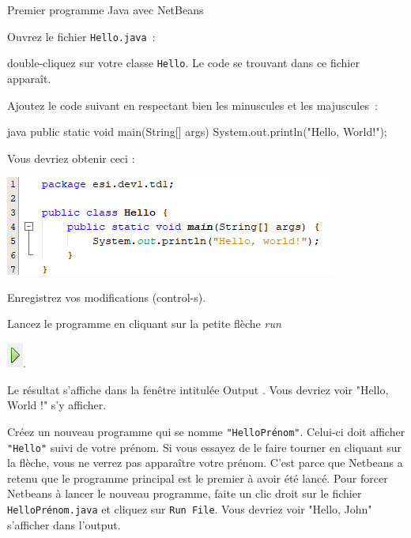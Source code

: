 \documentclass[a4paper,11pt]{article}
\begin{document}
\begin{Tutoriel}{Premier programme Java avec NetBeans}
\begin{steps}
		\item Ouvrez le fichier \texttt{Hello.java}~:
		
			double-cliquez sur votre classe \texttt{Hello}. 
			Le code se trouvant dans ce fichier apparaît.
			
%			
%			
			
			Ajoutez le code suivant en respectant bien les 
			minuscules et les majuscules~:
	
			\begin{Code}{java}
				public static void main(String[] args) {
					System.out.println("Hello, World!");
				}
			\end{Code}
			
			Vous devriez obtenir ceci :
			
			\begin{center}
				\includegraphics{images/nb_newproject_code}
			\end{center}
			Enregistrez vos modifications (control-s).
			
		\item Lancez le programme en cliquant sur la petite flèche \emph{run} 
			
			\includegraphics{images/nb_newproject_run}.
			
			Le résultat s'affiche dans la fenêtre intitulée \og Output \fg.
			Vous devriez voir "Hello, World !" s'y afficher.

		\item Créez un nouveau programme qui se nomme \texttt{"HelloPrénom"}. Celui-ci doit afficher \texttt{"Hello"} suivi de votre prénom.
		Si vous essayez de le faire tourner en cliquant sur la flèche, vous ne verrez pas apparaître votre prénom. C'est parce que Netbeans a retenu que le programme principal est le premier à avoir été lancé. Pour forcer Netbeans à lancer le nouveau programme, faite un clic droit sur le fichier \texttt{HelloPrénom.java} et cliquez sur \texttt{Run File}. Vous devriez voir "Hello, John" s'afficher dans l'output.


\end{steps}
\end{Tutoriel}
\end{document}
